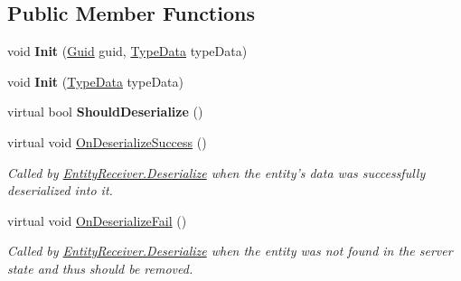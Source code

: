 \subsection*{Public Member Functions}
\begin{DoxyCompactItemize}
\item 
\hypertarget{class_skyrates_1_1_common_1_1_entity_1_1_entity_a5cacb91a3691f5a6c4b3087c98f402f9}{void {\bfseries Init} (\hyperlink{class_skyrates_1_1_common_1_1_entity_1_1_entity_ae32af79e6a33bed16aeb0455078885c8}{Guid} guid, \hyperlink{class_skyrates_1_1_common_1_1_entity_1_1_entity_1_1_type_data}{Type\-Data} type\-Data)}\label{class_skyrates_1_1_common_1_1_entity_1_1_entity_a5cacb91a3691f5a6c4b3087c98f402f9}

\item 
\hypertarget{class_skyrates_1_1_common_1_1_entity_1_1_entity_a1e1f4bba9e46f3753dda54a9db711a06}{void {\bfseries Init} (\hyperlink{class_skyrates_1_1_common_1_1_entity_1_1_entity_1_1_type_data}{Type\-Data} type\-Data)}\label{class_skyrates_1_1_common_1_1_entity_1_1_entity_a1e1f4bba9e46f3753dda54a9db711a06}

\item 
\hypertarget{class_skyrates_1_1_common_1_1_entity_1_1_entity_aa207bcb5c4e7ac19983bee537dfee751}{virtual bool {\bfseries Should\-Deserialize} ()}\label{class_skyrates_1_1_common_1_1_entity_1_1_entity_aa207bcb5c4e7ac19983bee537dfee751}

\item 
virtual void \hyperlink{class_skyrates_1_1_common_1_1_entity_1_1_entity_aa5a53dfb527054cd23f69bc8750f59e0}{On\-Deserialize\-Success} ()
\begin{DoxyCompactList}\small\item\em Called by \hyperlink{class_skyrates_1_1_common_1_1_entity_1_1_entity_receiver_a9da0b7c3a8b9e1ed7d10be74ce80482b}{Entity\-Receiver.\-Deserialize} when the entity's data was successfully deserialized into it. \end{DoxyCompactList}\item 
virtual void \hyperlink{class_skyrates_1_1_common_1_1_entity_1_1_entity_a8cf85f4ac28cf907926eef27148e5124}{On\-Deserialize\-Fail} ()
\begin{DoxyCompactList}\small\item\em Called by \hyperlink{class_skyrates_1_1_common_1_1_entity_1_1_entity_receiver_a9da0b7c3a8b9e1ed7d10be74ce80482b}{Entity\-Receiver.\-Deserialize} when the entity was not found in the server state and thus should be removed. \end{DoxyCompactList}\end{DoxyCompactItemize}
